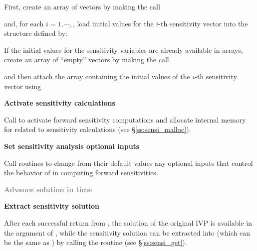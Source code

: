\begin{Steps}
  First, create an array of  vectors by making the call

  {\s} 

  {\p} 

  and, for each $i=1,\cdots,$, load initial values for the $i$-th sensitivity 
  vector into the structure defined by:

  {\s} 

  {\p} 

  If the initial values for the sensitivity variables are already available in
   arrays, create an array of  ``empty'' vectors by making the call

  {\s} 

  {\p} 

  and then attach the  array  containing the initial values of the
  $i$-th sensitivity vector using

  {\s} 
  
  {\p} 
  
\item
  {\bf Activate sensitivity calculations}

  Call \id{(\ldots);} to activate forward 
  sensitivity computations and allocate internal memory for {\idas} related 
  to sensitivity calculations (see \S\ref{ss:sensi_malloc}).

\item
  {\bf Set sensitivity analysis optional inputs}

  Call  routines to change from their default values any
  optional inputs that control the behavior of {\idas} in computing forward 
  sensitivities.

\item
  \textcolor{gray}{\bf Advance solution in time}

\item
  {\bf Extract sensitivity solution}

  After each successful return from , the solution of the
  original IVP is available in the  argument of ,
  while the sensitivity solution can be extracted into  (which can 
  be the same as ) by calling the routine 
  (see \S\ref{ss:sensi_get}).


\end{Steps}
